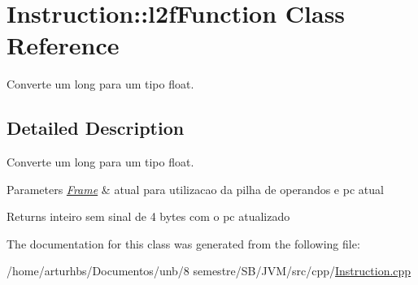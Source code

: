 \hypertarget{classInstruction_1_1l2fFunction}{}\section{Instruction\+:\+:l2f\+Function Class Reference}
\label{classInstruction_1_1l2fFunction}


Converte um long para um tipo float.  




\subsection{Detailed Description}
Converte um long para um tipo float. 


\begin{DoxyParams}{Parameters}
{\em \hyperlink{classFrame}{Frame}} & atual para utilizacao da pilha de operandos e pc atual \\
\hline
\end{DoxyParams}
\begin{DoxyReturn}{Returns}
inteiro sem sinal de 4 bytes com o pc atualizado 
\end{DoxyReturn}


The documentation for this class was generated from the following file\+:\begin{DoxyCompactItemize}
\item 
/home/arturhbs/\+Documentos/unb/8 semestre/\+S\+B/\+J\+V\+M/src/cpp/\hyperlink{Instruction_8cpp}{Instruction.\+cpp}\end{DoxyCompactItemize}
